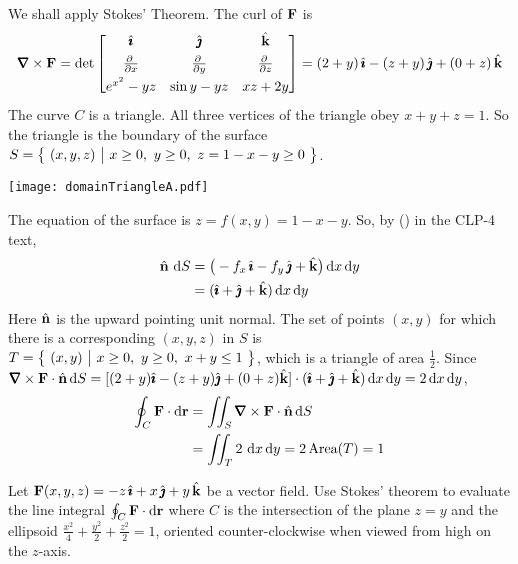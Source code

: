 \begin{solution}
We shall apply Stokes' Theorem. The curl of $\mathbf{F}$ is
\begin{equation*}
\vnabla\times\vF=\det\left[\begin{matrix}\hi & \hj & \hk \\[0.05in]
                  \pdiff{}{x} &
                  \pdiff{}{y} &
                  \pdiff{}{z} \\[0.05in]
                  e^{x^2} - yz & \sin y - yz & xz + 2y\end{matrix}\right] 
=(2+y)\,\hi-(z+y)\,\hj+(0+z)\,\hk
\end{equation*}
The curve $C$ is a triangle. All three vertices of the triangle obey
$x+y+z=1$. So the triangle is the boundary
of the surface $S=\big\{ \ (x,y,z)\ \big|\ x\ge 0,\ y\ge 0,\ z=1-x-y\ge 0\ \big\}$. 
\begin{center}
   \texttt{[image: domainTriangleA.pdf]}
\end{center}
The equation of the surface is $z=f(x,y)=1-x-y$.
So, by () in the CLP-4 text, 
\begin{align*}
\hat{\mathbf{n}}\ \mathrm{d}S
&=\big(-f_x\,\hat{\pmb{\imath}}-f_y\,\hat{\pmb{\jmath}}+\hat{\mathbf{k}}\big)\,\mathrm{d}x\,\mathrm{d}y\\
&=(\hat{\pmb{\imath}}+\hat{\pmb{\jmath}}+\hat{\mathbf{k}})\,\mathrm{d}x\,\mathrm{d}y
\end{align*}
Here $\hat{\mathbf{n}}$ is the upward pointing unit normal.
The set of points $(x,y)$ for which there is a corresponding $(x,y,z)$
in $S$ is  $T=\big\{ \ (x,y)\ \big|\ x\ge 0,\ y\ge 0,\ x+y\le 1\ \big\}$, which is a triangle
of area $\frac{1}{2}$.
Since $\vnabla\times\vF\cdot\hn\,\dee{S}
=[(2+y)\hi-(z+y)\hj+(0+z)\hk]\cdot(\hi+\hj+\hk)\,\dee{x}\,\dee{y}
= 2\,\dee{x}\,\dee{y}$,
\begin{align*}
\oint_C\vF\cdot \dee{\vr}&=\dblInt_S\vnabla\times\vF\cdot\hn\,\dee{S}\\
&=\dblInt_T 2\ \dee{x}\,\dee{y}
= 2\,\text{Area}(T)
=1
\end{align*}
\end{solution}



\begin{question}[M317 2001D] %
Let $\mathbf{F}(x,y,z)=-z\,\hat{\pmb{\imath}}+x\,\hat{\pmb{\jmath}}+y\,\hat{\mathbf{k}}$ be a vector field. Use
Stokes' theorem to evaluate the line integral 
$
\oint_C\mathbf{F}\cdot \mathrm{d}\mathbf{r}
$
where $C$ is the intersection of the plane $z=y$ and the ellipsoid 
$\frac{x^2}{4}+\frac{y^2}{2}+\frac{z^2}{2}=1$, oriented 
counter-clockwise when viewed from high on the  $z$-axis.

\end{question}

